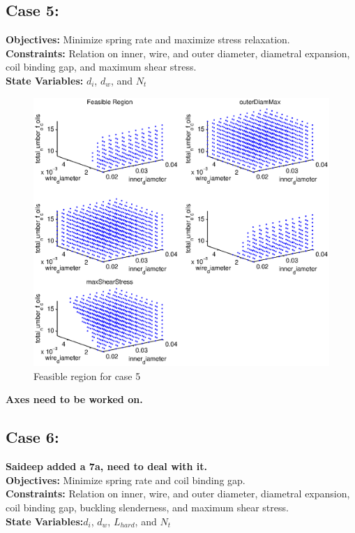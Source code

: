 \documentclass[10pt]{article}
\begin{document}
\newpage
\subsection{Case 5:}
\label{sec:Case5}

	\textbf{Objectives:} Minimize spring rate and maximize stress relaxation.\\
	\textbf{Constraints:}  Relation on inner, wire, and outer diameter, diametral expansion, coil binding gap, and maximum shear stress. \\
		\textbf{State Variables:} $d_{i}$, $d_{w}$, and $N_{t}$ \\
		
				\begin{figure}[h!]
		 \begin{center}\includegraphics[scale=.50]{Case_511_34810.eps}\end{center}
		 \caption{Feasible region for case 5}
		 \label{Feasible Case 5}
		 
		 \end{figure}
		 \textbf{Axes need to be worked on.}

\newpage
\subsection{Case 6:}
\label{sec:Case6}
\textbf{Saideep added a 7a, need to deal with it.}\\
	\textbf{Objectives:} Minimize spring rate and coil binding gap.\\
	\textbf{Constraints:} Relation on inner, wire, and outer diameter, diametral expansion, coil binding gap, buckling slenderness, and maximum shear stress. \\
		\textbf{State Variables:}$d_{i}$, $d_{w}$, $L_{hard}$, and $N_{t}$ \\
\end{document}
